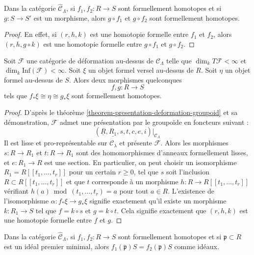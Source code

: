 \begin{lemma}
\label{lemma-composition-homotopic}
Dans la catégorie $\widehat{\mathcal{C}}_\Lambda$, si
$f_1, f_2 : R \to S$ sont formellement homotopes et si $g : S \to S'$ est un
morphisme, alors $g \circ f_1$ et $g \circ f_2$ sont formellement homotopes.
\end{lemma}

\begin{proof}
En effet, si $(r, h, k)$ est une homotopie formelle entre $f_1$ et $f_2$,
alors $(r, h, g \circ k)$ est une homotopie formelle entre $g \circ f_1$ et
$g \circ f_2$.
\end{proof}

\begin{lemma}
\label{lemma-versal-unique-up-to-homotopy}
Soit $\mathcal{F}$ une catégorie de déformation au-dessus de
$\mathcal{C}_\Lambda$ telle que $\dim_k T\mathcal{F} < \infty$ et
$\dim_k \text{Inf}(\mathcal{F}) < \infty$. Soit $\xi$ un objet formel versel
au-dessus de $R$. Soit $\eta$ un objet formel au-dessus de $S$. Alors deux
morphismes quelconques
$$
f, g : R \to S
$$
tels que $f_*\xi \cong \eta \cong g_*\xi$ sont formellement homotopes.
\end{lemma}

\begin{proof}
D'après le théorème \ref{theorem-presentation-deformation-groupoid} et sa
démonstration, $\mathcal{F}$ admet une présentation par le groupoïde en foncteurs
suivant :
$$
(\underline{R}, \underline{R_1}, s, t, c, e, i)|_{\mathcal{C}_\Lambda}
$$
Il est lisse et pro-représentable sur $\mathcal{C}_\lambda$ et présente $\mathcal{F}$. Alors les
morphismes $s : R \to R_1$ et $t : R \to R_1$ sont des homomorphismes
d'anneaux formellement lisses, et $e : R_1 \to R$ est une section. En
particulier, on peut choisir un isomorphisme
$R_1 = R[[t_1, \ldots, t_r]]$ pour un certain $r \geq 0$, tel que $s$ soit
l'inclusion $R \subset R[[t_1, \ldots, t_r]]$ et que $t$ corresponde à un
morphisme $h : R \to R[[t_1, \ldots, t_r]]$ vérifiant
$h(a) \bmod (t_1, \ldots, t_r) = a$ pour tout $a \in R$. L'existence de
l'isomorphisme $\alpha : f_*\xi \to g_*\xi$ signifie exactement qu'il existe
un morphisme $k : R_1 \to S$ tel que $f = k \circ s$ et $g = k \circ t$.
Cela signifie exactement que $(r, h, k)$ est une homotopie formelle entre $f$
et $g$.
\end{proof}

\begin{lemma}
\label{lemma-homotopic-minimal-prime}
Dans la catégorie $\widehat{\mathcal{C}}_\Lambda$, si
$f_1, f_2 : R \to S$ sont formellement homotopes et si
$\mathfrak p \subset R$ est un idéal premier minimal, alors
$f_1(\mathfrak p)S = f_2(\mathfrak p)S$ comme idéaux.
\end{lemma}

